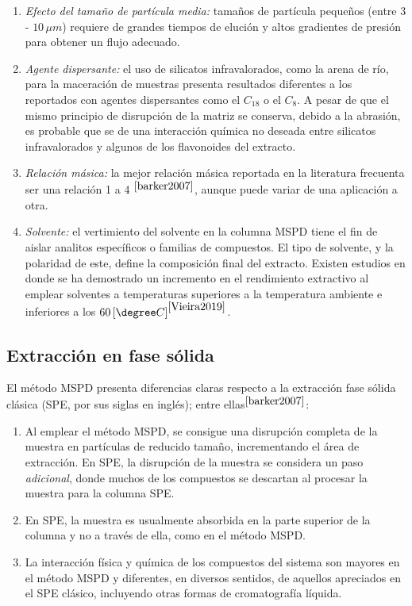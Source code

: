 \begin{enumerate}
	\item \textit{Efecto del tama\~no de part\'icula media:} tama\~nos de part\'icula peque\~nos (entre $3$ - $10 \, \mu m$) requiere de grandes tiempos de eluci\'on y altos gradientes de presi\'on para obtener un flujo adecuado. 
	\item \textit{Agente dispersante:} el uso de silicatos infravalorados, como la arena de r\'io, para la maceraci\'on de muestras presenta resultados diferentes a los reportados con agentes dispersantes como el $C_{18}$ o el $C_8$. A pesar de que el mismo principio de disrupci\'on de la matriz se conserva, debido a la abrasi\'on, es probable que se de una interacci\'on qu\'imica no deseada entre silicatos infravalorados y algunos de los flavonoides del extracto.
	\item \textit{Relaci\'on m\'asica:} la mejor relaci\'on m\'asica reportada en la literatura frecuenta ser una relaci\'on 1 a 4 $^{\cite{barker2007}}$, aunque puede variar de una aplicaci\'on a otra. 
	\item \textit{Solvente:} el vertimiento del solvente en la columna MSPD tiene el fin de aislar analitos espec\'ificos o familias de compuestos. El tipo de solvente, y la polaridad de este, define la composici\'on final del extracto. Existen estudios en donde se ha demostrado un incremento en el rendimiento extractivo al emplear solventes a temperaturas superiores a la temperatura ambiente e inferiores a los $60 \left[ \degree C \right]^{\cite{Vieira2019}}$. 
\end{enumerate}

\subsection{Extracci\'on en fase s\'olida}

\noindent
\justify

El m\'etodo MSPD presenta diferencias claras respecto a la extracci\'on fase s\'olida cl\'asica (SPE, por sus siglas en ingl\'es); entre ellas$^{\cite{barker2007}}$:
\begin{enumerate}
	\item Al emplear el m\'etodo MSPD, se consigue una disrupci\'on completa de la muestra en part\'iculas de reducido tama\~no, incrementando el \'area de extracci\'on. En SPE, la disrupci\'on de la muestra se considera un paso \textit{adicional}, donde muchos de los compuestos se descartan al procesar la muestra para la columna SPE. 
	\item En SPE, la muestra es usualmente absorbida en la parte superior de la columna y no a trav\'es de ella, como en el m\'etodo MSPD.
	\item La interacci\'on f\'isica y qu\'imica de los compuestos del sistema son mayores en el m\'etodo MSPD y diferentes, en diversos sentidos, de aquellos apreciados en el SPE cl\'asico, incluyendo otras formas de cromatograf\'ia l\'iquida.
\end{enumerate}